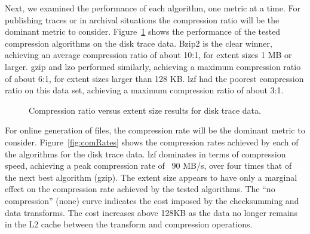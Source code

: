 Next, we examined the performance of each algorithm, one metric at a time.
For publishing traces or in archival situations the compression ratio will be the dominant
metric to consider.  Figure~\ref{fig:comRatio} shows the performance
of the tested compression algorithms on the disk trace data.
Bzip2 is the clear winner, achieving an average compression
ratio of about 10:1, for extent sizes 1 MB or larger.  
gzip and lzo performed similarly, achieving a maximum compression
ratio of about 6:1, for extent sizes larger than 128 KB.
lzf had the poorest compression ratio on this data set, achieving a
maximum compression ratio of about 3:1.

\begin{figure}[tbh]
\caption{ Compression ratio versus extent size results for disk trace data.}
\label{fig:comRatio}
\end{figure}


For online generation of \DataSeries{} files, the compression rate will
be the dominant metric to consider.  Figure~\ref{fig:comRates} shows the compression rates achieved by
each of the algorithms for the disk trace data.  
lzf dominates in terms of compression speed, achieving 
a peak compression rate of ~90 MB/s, over four times
that of the next best algorithm (gzip).  The extent size appears to
have only a marginal effect on the compression rate achieved by the 
tested algorithms.  The ``no
compression'' (none) curve indicates the cost imposed
by the checksumming and data transforms.  The cost increases above 128KB 
as the data no longer remains in the L2 cache between the transform and
compression operations.

